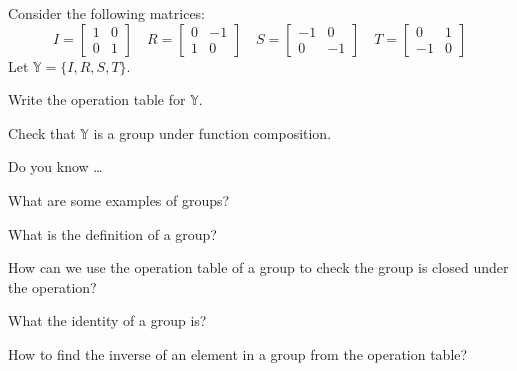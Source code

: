 \begin{exer}[\exerU] %
\label{exer_another_matrix_group}
    Consider the following matrices:      
        $$I = \left[ \begin{array} {cc} 1 & 0 \\ 0 & 1 \end{array} \right] \quad 
        R = \left[ \begin{array} {rr} 0 & -1 \\ 1 & 0 \end{array} \right] \quad  
        S = \left[ \begin{array} {rr} -1 & 0 \\ 0 & -1 \end{array} \right] \quad
        T = \left[ \begin{array} {rr} 0 & 1 \\ -1 & 0 \end{array} \right]$$
    Let $\mathbb{Y} = \{I, R, S, T\}$. 
        \begin{exerpart}
            \item Write the operation table for $\mathbb{Y}$.       
            \item Check that $\mathbb{Y}$ is a group under function composition.
        \end{exerpart}
\end{exer}


\begin{exer}[\exerR] %
\label{exer_dyk_groups}
    Do you know \ldots
        \begin{exerpart}
            \item What are some examples of groups?
            \item What is the definition of a group?
            \item How can we use the operation table of a group to check the group is closed under the operation?
            \item What the identity of a group is?
            \item How to find the inverse of an element in a group from the operation table?
        \end{exerpart}
\end{exer}

